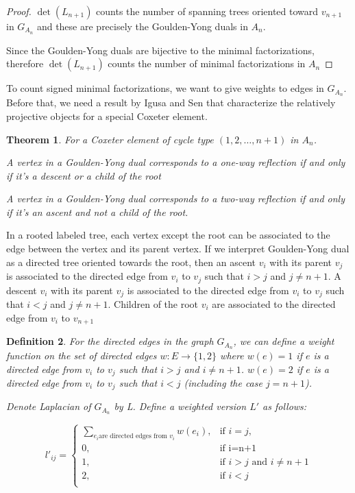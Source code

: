 \documentclass[11pt]{amsart}
\newtheorem{thm}{Theorem}[section]
\newtheorem{defi}[thm]{Definition}%
\begin{document}
\begin{proof}
    $\det(L_{n+1})$ counts the number of spanning trees oriented toward $v_{n+1}$ in $G_{A_n}$ and these are precisely the Goulden-Yong duals in $A_n$.

    Since the Goulden-Yong duals are bijective to the minimal factorizations, therefore $\det(L_{n+1})$ counts the number of minimal factorizations in $A_n$
\end{proof}

To count signed minimal factorizations, we want to give weights to edges in $G_{A_n}$. Before that, we need a result by Igusa and Sen that characterize the relatively projective objects for a special Coxeter element.

\begin{thm}\cite{igusa2023exceptional}
    For a Coxeter element of cycle type $(1,2,\dots,{n+1})$ in $A_n$. 

    A vertex in a Goulden-Yong dual corresponds to a one-way reflection if and only if it's a descent or a child of the root

    A vertex in a Goulden-Yong dual corresponds to a two-way reflection if and only if it's an ascent and not a child of the root.
\end{thm}

In a rooted labeled tree, each vertex except the root can be associated to the edge between the vertex and its parent vertex. If we interpret Goulden-Yong dual as a directed tree oriented towards the root, then an ascent $v_i$ with its parent $v_j$ is associated to the directed edge from $v_i$ to $v_j$ such that $i>j$ and $j \neq n+1$. A descent $v_i$ with its parent $v_j$ is associated to the directed edge from $v_i$ to $v_j$ such that $i<j$ and $j \neq n+1$. Children of the root $v_i$ are associated to the directed edge from $v_i$ to $v_{n+1}$

\begin{defi}
    For the directed edges in the graph $G_{A_n}$, we can define a weight function on the set of directed edges $w:E \rightarrow \{1,2\}$ where $w(e)=1$ if $e$ is a directed edge from $v_i$ to $v_j$ such that $i > j$ and $i\neq n+1$. $w(e)=2$ if $e$ is a directed edge from $v_i$ to $v_j$ such that $i < j$ (including the case $j=n+1$).%
    
    Denote Laplacian of $G_{A_n}$ by L. Define a weighted version $L'$ as follows:

    \begin{equation}
    l'_{ij}=\begin{cases}
    \sum_{e_i \text{are directed edges from $v_i$}} w(e_i), & \text{if $i=j$},\\
    0, & \text{if i=n+1} \\
    1, & \text{if $i > j$ and $i \neq n+1$} \\
    2, & \text{if $i < j$} \\%
    \end{cases}
    \end{equation}
\end{defi}
\end{document}
